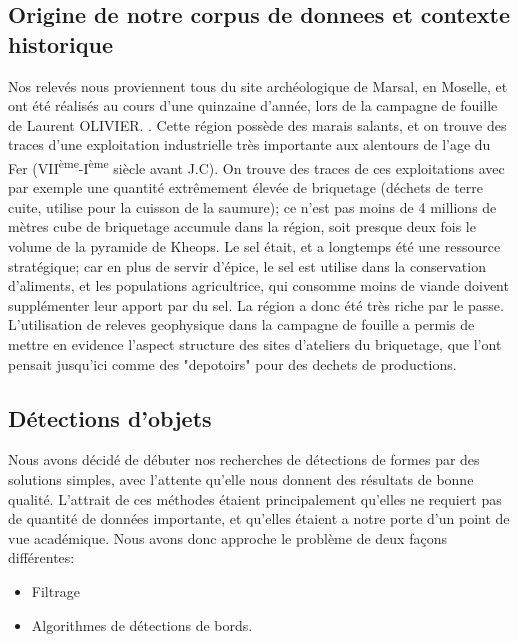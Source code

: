 \documentclass[a4paper, 12pt, titlepage, oneside, french]{article}
\begin{document}
	\subsection{Origine de notre corpus de donnees et contexte historique}

	Nos relevés nous proviennent tous du site archéologique de Marsal, en Moselle, et ont été réalisés au cours d'une quinzaine d'année, lors de la campagne de fouille de Laurent OLIVIER.%
	. Cette région possède des marais salants, et on trouve des traces d'une exploitation industrielle très importante aux alentours de l'age du Fer (VII\textsuperscript{ème}-I\textsuperscript{ème} siècle avant J.C). On trouve des traces de ces exploitations avec par exemple une quantité extrêmement élevée de briquetage (déchets de terre cuite, utilise pour la cuisson de la saumure); ce n'est pas moins de 4 millions de mètres cube de briquetage accumule dans la région, soit presque deux fois le volume de la pyramide de Kheops. Le sel était, et a longtemps été une ressource stratégique; car en plus de servir d'épice, le sel est utilise dans la conservation d'aliments, et les populations agricultrice, qui consomme moins de viande doivent supplémenter leur apport par du sel. La région a donc été très riche par le passe. 
	L'utilisation de releves geophysique dans la campagne de fouille a permis de mettre en evidence l'aspect structure des sites d'ateliers du briquetage, que l'ont pensait jusqu'ici comme des "depotoirs" pour des dechets de productions.  

	\newpage
	\subsection{Détections d'objets}
	Nous avons décidé de débuter nos recherches de détections de formes par des solutions simples, avec l'attente qu'elle nous donnent des résultats de bonne qualité. L'attrait de ces méthodes étaient principalement qu'elles ne requiert pas de quantité de données importante, et qu'elles étaient a notre porte d'un point de vue académique. Nous avons donc approche le problème de deux façons différentes:
	\begin{itemize}
		\item Filtrage
		\item Algorithmes de détections de bords.
	\end{itemize}
\end{document}
